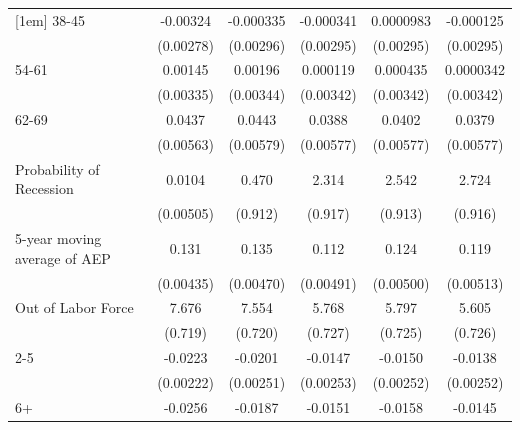 {\begin{tabular}{l*{5}{c}}
[1em]
38-45               &    -0.00324         &   -0.000335         &   -0.000341         &   0.0000983         &   -0.000125         \\
                    &   (0.00278)         &   (0.00296)         &   (0.00295)         &   (0.00295)         &   (0.00295)         \\
[1em]
54-61               &     0.00145         &     0.00196         &    0.000119         &    0.000435         &   0.0000342         \\
                    &   (0.00335)         &   (0.00344)         &   (0.00342)         &   (0.00342)         &   (0.00342)         \\
[1em]
62-69               &      0.0437\sym{***}&      0.0443\sym{***}&      0.0388\sym{***}&      0.0402\sym{***}&      0.0379\sym{***}\\
                    &   (0.00563)         &   (0.00579)         &   (0.00577)         &   (0.00577)         &   (0.00577)         \\
[1em]
Probability of Recession&      0.0104\sym{**} &       0.470         &       2.314\sym{**} &       2.542\sym{***}&       2.724\sym{***}\\
                    &   (0.00505)         &     (0.912)         &     (0.917)         &     (0.913)         &     (0.916)         \\
[1em]
5-year moving average of AEP&       0.131\sym{***}&       0.135\sym{***}&       0.112\sym{***}&       0.124\sym{***}&       0.119\sym{***}\\
                    &   (0.00435)         &   (0.00470)         &   (0.00491)         &   (0.00500)         &   (0.00513)         \\
[1em]
Out of Labor Force  &       7.676\sym{***}&       7.554\sym{***}&       5.768\sym{***}&       5.797\sym{***}&       5.605\sym{***}\\
                    &     (0.719)         &     (0.720)         &     (0.727)         &     (0.725)         &     (0.726)         \\
[1em]
2-5                 &     -0.0223\sym{***}&     -0.0201\sym{***}&     -0.0147\sym{***}&     -0.0150\sym{***}&     -0.0138\sym{***}\\
                    &   (0.00222)         &   (0.00251)         &   (0.00253)         &   (0.00252)         &   (0.00252)         \\
[1em]
6+                  &     -0.0256\sym{***}&     -0.0187\sym{***}&     -0.0151\sym{***}&     -0.0158\sym{***}&     -0.0145\sym{***}\\

\end{tabular}}
